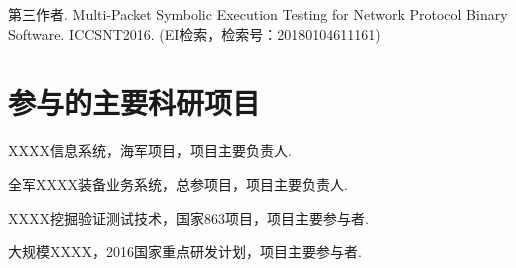 \begin{resume}
\begin{enumerate}[{[}1{]}]
    \item 第三作者. Multi-Packet
    Symbolic Execution Testing for Network Protocol Binary Software. ICCSNT2016.
    (EI检索，检索号：20180104611161)
    
    
    \end{enumerate}

  \section*{参与的主要科研项目} %
  \begin{enumerate}[{[}1{]}]
  \addtolength{\itemsep}{-.36\baselineskip}%
  \item XXXX信息系统，海军项目，项目主要负责人.
  \item 全军XXXX装备业务系统，总参项目，项目主要负责人.
  \item XXXX挖掘验证测试技术，国家863项目，项目主要参与者.
  \item 大规模XXXX，2016国家重点研发计划，项目主要参与者.
  \end{enumerate}
\end{resume}
